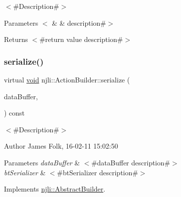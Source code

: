 $<$\#\+Description\#$>$


\begin{DoxyParams}[1]{Parameters}
$<$ & {\em } & description\#$>$\\
\hline
\end{DoxyParams}
\begin{DoxyReturn}{Returns}
$<$\#return value description\#$>$ 
\end{DoxyReturn}
\mbox{\label{classnjli_1_1_action_builder_a08a4404af37bd53504e5b72e1c431442}} 
\subsubsection{\texorpdfstring{serialize()}{serialize()}}
{\footnotesize\ttfamily virtual \mbox{\hyperlink{_thread_8h_af1e856da2e658414cb2456cb6f7ebc66}{void}} njli\+::\+Action\+Builder\+::serialize (\begin{DoxyParamCaption}\item[{\mbox{\hyperlink{_thread_8h_af1e856da2e658414cb2456cb6f7ebc66}{void}} $\ast$}]{data\+Buffer,  }\item[{bt\+Serializer $\ast$}]{ }\end{DoxyParamCaption}) const\hspace{0.3cm}{\ttfamily [virtual]}}



$<$\#\+Description\#$>$ 

\begin{DoxyAuthor}{Author}
James Folk, 16-\/02-\/11 15\+:02\+:50
\end{DoxyAuthor}

\begin{DoxyParams}{Parameters}
{\em data\+Buffer} & $<$\#data\+Buffer description\#$>$ \\
\hline
{\em bt\+Serializer} & $<$\#bt\+Serializer description\#$>$ \\
\hline
\end{DoxyParams}


Implements \mbox{\hyperlink{classnjli_1_1_abstract_builder_ab66b774e02ccb9da554c9aab7fa6d981}{njli\+::\+Abstract\+Builder}}.

\mbox{\label{classnjli_1_1_action_builder_a569cbb4a019aabaf3f77c13f20625d8b}} 
